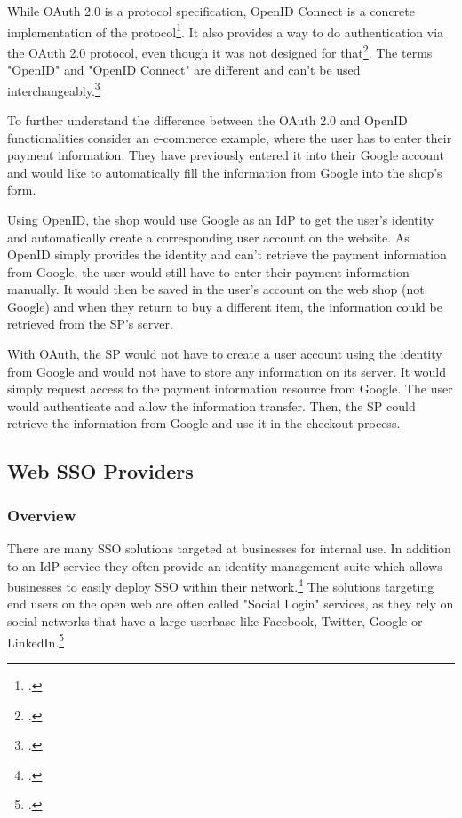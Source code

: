 While OAuth 2.0 is a protocol specification, OpenID Connect is a concrete implementation of the protocol\footcite[Cp.][p. 189]{Fett2017}.
It also provides a way to do authentication via the OAuth 2.0 protocol, even though it was not designed for that\footcite[Cp.][]{Hrnjadovic2020}.
The terms "OpenID" and "OpenID Connect" are different and can't be used interchangeably.\footcite[Cp.][]{Wesener2021}

To further understand the difference between the OAuth 2.0 and OpenID functionalities consider an e-commerce example,
where the user has to enter their payment information. They have previously entered it into their Google account and would
like to automatically fill the information from Google into the shop's form.

Using OpenID, the shop would use Google as an \ac{IdP} to get the user's identity and automatically create a corresponding
user account on the website. As OpenID simply provides the identity and can't retrieve the payment information from Google,
the user would still have to enter their payment information manually.
It would then be saved in the user's account on the web shop (not Google) and when they return to buy a different item,
the information could be retrieved from the \ac{SP}'s server.

With OAuth, the \ac{SP} would not have to create a user account using the identity from Google and would not have to store any
information on its server. It would simply request access to the payment information resource from Google. The user would
authenticate and allow the information transfer. Then, the \ac{SP} could retrieve the information from Google and use it
in the checkout process.

\subsection{Web SSO Providers}

\subsubsection{Overview}

There are many \ac{SSO} solutions targeted at businesses for internal use.
In addition to an \ac{IdP} service they often provide an identity management suite which allows businesses
to easily deploy \ac{SSO} within their network.\footcite[Cp.][]{Witts2022}
The solutions targeting end users on the open web are often called "Social Login" services, as they rely on 
social networks that have a large userbase like Facebook, Twitter, Google or LinkedIn.\footcite[Cp.][p. 2]{Gafni2014}

